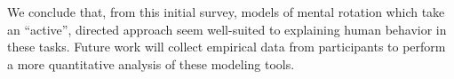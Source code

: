 \documentclass{article} %
\newcommand{\TODO}[1]{\textcolor{red}{[TODO: #1]}}
\begin{document}
We conclude that, from this initial survey, models of mental rotation
which take an ``active'', directed approach seem well-suited to
explaining human behavior in these tasks. Future work will collect
empirical data from participants to perform a more quantitative
analysis of these modeling tools.



\renewcommand\refname{\normalsize{References}}


\end{document}
